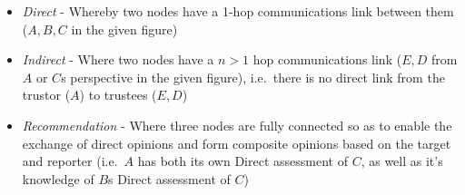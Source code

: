 \begin{itemize}
  \item \emph{Direct} - Whereby two nodes have a 1-hop communications link between them ($A,B,C$ in the given figure)
  \item \emph{Indirect} - Where two nodes have a $n>1$ hop communications link ($E,D$ from $A$ or $C$s perspective in the given figure), i.e.\ there is no direct link from the trustor ($A$) to trustees ($E,D$)
  \item \emph{Recommendation} -  Where three nodes are fully connected so as to enable the exchange of direct opinions and form composite opinions based on the target and reporter (i.e.\ $A$ has both its own Direct assessment of $C$, as well as it's knowledge of $B$s Direct assessment of $C$)
\end{itemize}

